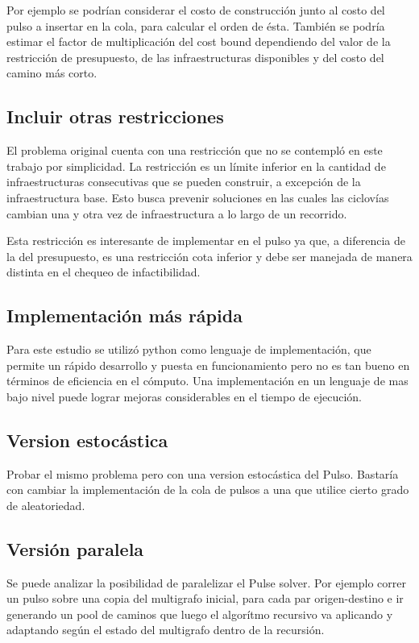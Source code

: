 \documentclass{article}
\begin{document}
  Por ejemplo se podrían considerar el costo de construcción junto al costo del pulso a insertar en la cola, para calcular el orden de ésta. También se podría estimar el factor de multiplicación del cost bound dependiendo del valor de la restricción de presupuesto, de las infraestructuras disponibles y del costo del camino más corto.

  \subsection*{Incluir otras restricciones}

  El problema original cuenta con una restricción que no se contempló en este trabajo por simplicidad. La restricción es un límite inferior en la cantidad de infraestructuras consecutivas que se pueden construir, a excepción de la infraestructura base. Esto busca prevenir soluciones en las cuales las ciclovías cambian una y otra vez de infraestructura a lo largo de un recorrido.

  Esta restricción es interesante de implementar en el pulso ya que, a diferencia de la del presupuesto, es una restricción cota inferior y debe ser manejada de manera distinta en el chequeo de infactibilidad.

  \subsection*{Implementación más rápida}

  Para este estudio se utilizó python como lenguaje de implementación, que permite un rápido desarrollo y puesta en funcionamiento pero no es tan bueno en términos de eficiencia en el cómputo. Una implementación en un lenguaje de mas bajo nivel puede lograr mejoras considerables en el tiempo de ejecución.

  \subsection*{Version estocástica}

  Probar el mismo problema pero con una version estocástica del Pulso. Bastaría con cambiar la implementación de la cola de pulsos a una que utilice cierto grado de aleatoriedad.

  \subsection*{Versión paralela}

  Se puede analizar la posibilidad de paralelizar el Pulse solver. Por ejemplo correr un pulso sobre una copia del multigrafo inicial, para cada par origen-destino e ir generando un pool de caminos que luego el algorítmo recursivo va aplicando y adaptando según el estado del multigrafo dentro de la recursión.
\end{document}
